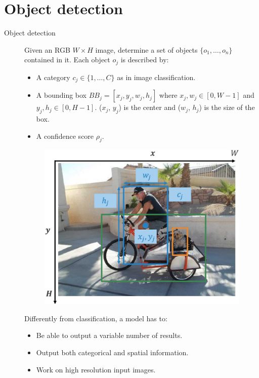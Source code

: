 \chapter{Object detection}


\begin{description}
    \item[Object detection] 
        Given an RGB $W \times H$ image, determine a set of objects $\{ o_1, \dots, o_n \}$ contained in it. Each object $o_j$ is described by:
        \begin{itemize}
            \item A category $c_j \in \{ 1, \dots, C \}$ as in image classification.
            \item A bounding box $BB_j = [ x_j, y_j, w_j, h_j ]$ where $x_j, w_j \in [0, W-1]$ and $y_j, h_j \in [0, H-1]$. ($x_j$, $y_j$) is the center and ($w_j$, $h_j$) is the size of the box.
            \item A confidence score $\rho_j$.
        \end{itemize}

        \begin{figure}[H]
            \centering
            \includegraphics[width=0.45\linewidth]{./img/_object_detection_example.jpg}
        \end{figure}

        \begin{remark}
            Differently from classification, a model has to:
            \begin{itemize}
                \item Be able to output a variable number of results.
                \item Output both categorical and spatial information.
                \item Work on high resolution input images.
            \end{itemize}
        \end{remark}
\end{description}



